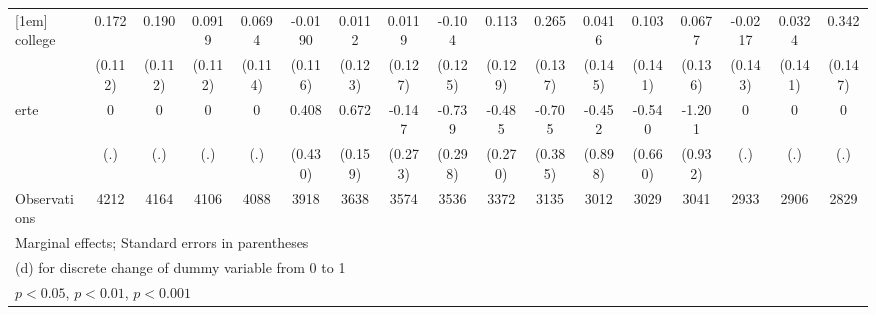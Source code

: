 {\begin{tabular}{l*{16}{c}}
[1em]
college             &       0.172         &       0.190         &      0.0919         &      0.0694         &     -0.0190         &      0.0112         &      0.0119         &      -0.104         &       0.113         &       0.265         &      0.0416         &       0.103         &      0.0677         &     -0.0217         &      0.0324         &       0.342\sym{*}  \\
                    &     (0.112)         &     (0.112)         &     (0.112)         &     (0.114)         &     (0.116)         &     (0.123)         &     (0.127)         &     (0.125)         &     (0.129)         &     (0.137)         &     (0.145)         &     (0.141)         &     (0.136)         &     (0.143)         &     (0.141)         &     (0.147)         \\
[1em]
erte                &           0         &           0         &           0         &           0         &       0.408         &       0.672\sym{***}&      -0.147         &      -0.739\sym{*}  &      -0.485         &      -0.705         &      -0.452         &      -0.540         &      -1.201         &           0         &           0         &           0         \\
                    &         (.)         &         (.)         &         (.)         &         (.)         &     (0.430)         &     (0.159)         &     (0.273)         &     (0.298)         &     (0.270)         &     (0.385)         &     (0.898)         &     (0.660)         &     (0.932)         &         (.)         &         (.)         &         (.)         \\
\hline
Observations        &        4212         &        4164         &        4106         &        4088         &        3918         &        3638         &        3574         &        3536         &        3372         &        3135         &        3012         &        3029         &        3041         &        2933         &        2906         &        2829         \\
\hline\hline
\multicolumn{17}{l}{\footnotesize Marginal effects; Standard errors in parentheses}\\
\multicolumn{17}{l}{\footnotesize  (d) for discrete change of dummy variable from 0 to 1}\\
\multicolumn{17}{l}{\footnotesize \sym{*} \(p<0.05\), \sym{**} \(p<0.01\), \sym{***} \(p<0.001\)}\\
\end{tabular}
}
